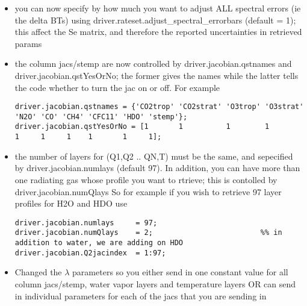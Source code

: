\documentclass[11pt]{article}
\begin{document}
\begin{itemize}

\item you can now specify by how much you want to adjust ALL spectral errors (ie the delta BTs) using
 driver.rateset.adjust_spectral_errorbars (default = 1); 
this affect the Se matrix, and therefore the reported uncertainties in retrieved params

\item the column jacs/stemp are now controlled by driver.jacobian.qstnames and driver.jacobian.qstYesOrNo; the former gives
      the names while the latter tells the code whether to turn the jac on or off. For example

\begin{verbatim}
driver.jacobian.qstnames = {'CO2trop' 'CO2strat' 'O3trop' 'O3strat' 'N2O' 'CO' 'CH4' 'CFC11' 'HDO' 'stemp'};
driver.jacobian.qstYesOrNo = [1       1          1        1         1     1     1    1       1     1];
\end{verbatim}

\item the number of layers for (Q1,Q2 .. QN,T) must be the same, and sepecified by driver.jacobian.numlays (default 97). In addition,
you can have more than one radiating gas whose profile you want to rtrieve; this is contolled by driver.jacobian.numQlays
So for example if you wish to retrieve 97 layer profiles for H2O and HDO use

\begin{verbatim}
driver.jacobian.numlays     = 97;
driver.jacobian.numQlays    = 2;                         %% in addition to water, we are adding on HDO
driver.jacobian.Q2jacindex  = 1:97;
\end{verbatim}

\item Changed the $\lambda$ parameters so you either send in one constant value for all column jacs/stemp, water vapor layers and
temperature layers OR can send in individual parameters for each of the jacs that you are sending in \\


\end{itemize}
\end{document}
